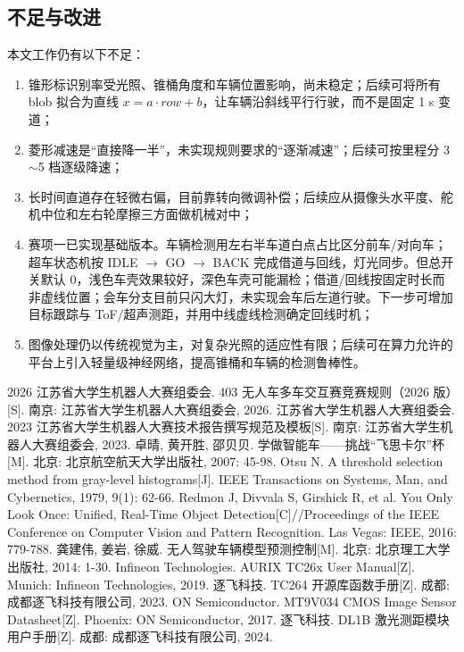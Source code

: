 \documentclass{MaiTechReport}
\begin{document}
\subsection{不足与改进}
本文工作仍有以下不足：
\begin{enumerate}
  \item 锥形标识别率受光照、锥桶角度和车辆位置影响，尚未稳定；后续可将所有 blob 拟合为直线 $x=a\cdot row+b$，让车辆沿斜线平行行驶，而不是固定 1 s 变道；
  \item 菱形减速是“直接降一半”，未实现规则要求的“逐渐减速”；后续可按里程分 3$\sim$5 档逐级降速；
  \item 长时间直道存在轻微右偏，目前靠转向微调补偿；后续应从摄像头水平度、舵机中位和左右轮摩擦三方面做机械对中；
  \item 赛项一已实现基础版本。车辆检测用左右半车道白点占比区分前车/对向车；超车状态机按 IDLE $\to$ GO $\to$ BACK 完成借道与回线，灯光同步。但总开关默认 0，浅色车壳效果较好，深色车壳可能漏检；借道/回线按固定时长而非虚线位置；会车分支目前只闪大灯，未实现会车后左道行驶。下一步可增加目标跟踪与 ToF/超声测距，并用中线虚线检测确定回线时机；
  \item 图像处理仍以传统视觉为主，对复杂光照的适应性有限；后续可在算力允许的平台上引入轻量级神经网络，提高锥桶和车辆的检测鲁棒性。
\end{enumerate}

\begin{MaiReferences}
   2026 江苏省大学生机器人大赛组委会. 403 无人车多车交互赛竞赛规则（2026 版）[S]. 南京: 江苏省大学生机器人大赛组委会, 2026.
   江苏省大学生机器人大赛组委会. 2023 江苏省大学生机器人大赛技术报告撰写规范及模板[S]. 南京: 江苏省大学生机器人大赛组委会, 2023.
   卓晴, 黄开胜, 邵贝贝. 学做智能车——挑战“飞思卡尔”杯[M]. 北京: 北京航空航天大学出版社, 2007: 45-98.
   Otsu N. A threshold selection method from gray-level histograms[J]. IEEE Transactions on Systems, Man, and Cybernetics, 1979, 9(1): 62-66.
   Redmon J, Divvala S, Girshick R, et al. You Only Look Once: Unified, Real-Time Object Detection[C]//Proceedings of the IEEE Conference on Computer Vision and Pattern Recognition. Las Vegas: IEEE, 2016: 779-788.
   龚建伟, 姜岩, 徐威. 无人驾驶车辆模型预测控制[M]. 北京: 北京理工大学出版社, 2014: 1-30.
   Infineon Technologies. AURIX TC26x User Manual[Z]. Munich: Infineon Technologies, 2019.
   逐飞科技. TC264 开源库函数手册[Z]. 成都: 成都逐飞科技有限公司, 2023.
   ON Semiconductor. MT9V034 CMOS Image Sensor Datasheet[Z]. Phoenix: ON Semiconductor, 2017.
   逐飞科技. DL1B 激光测距模块用户手册[Z]. 成都: 成都逐飞科技有限公司, 2024.
\end{MaiReferences}
\end{document}
